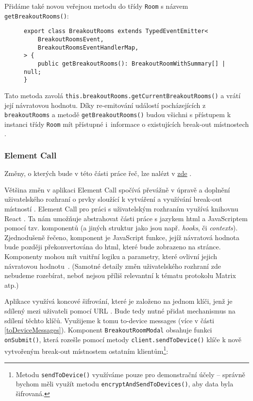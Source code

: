 Přidáme také
novou veřejnou metodu do třídy \texttt{Room} s názvem
\texttt{getBreakoutRooms()}:

\begin{figure}[H]
    \begin{verbatim}
export class BreakoutRooms extends TypedEventEmitter<
	BreakoutRoomsEvent,
	BreakoutRoomsEventHandlerMap,
> {
	public getBreakoutRooms(): BreakoutRoomWithSummary[] | null;
}
	\end{verbatim}
\end{figure}

Tato metoda zavolá
\texttt{this.breakoutRooms.getCurrentBreakoutRooms()} a vrátí
její návratovou hodnotu. Díky re-emitování událostí pocházejících z
\texttt{breakoutRooms} a metodě
\texttt{getBreakoutRooms()} budou všichni s přístupem k instanci
třídy \texttt{Room} mít přístupné i~informace o existujících
break-out místnostech \parencite{GitHub-MatrixJSSDK-BreakoutRooms}.

\subsubsection{Element Call}

Změny, o kterých bude v této části práce řeč, lze nalézt v
\href{https://github.com/vector-im/element-call/pull/1615/}{zde}
\parencite{GitHub-ElementCall-BreakoutRooms}.

Většina změn v aplikaci Element Call spočívá převážně v úpravě a doplnění
uživatelského rozhraní o prvky sloužící k vytváření a využívání break-out
místností \parencite{GitHub-ElementCall-BreakoutRooms}. Element Call pro práci s
uživatelským rozhraním využívá knihovnu React \parencite{GitHub-ElementCall}. Ta
nám umožňuje abstrahovat části práce s jazykem \gls{html} a JavaScriptem pomocí
tzv. komponentů (a jiných struktur jako jsou např. \textit{hooks}, či
\textit{contexts}). Zjednodušeně řečeno, komponent je JavaScript funkce, jejíž
návratová hodnota bude později překonvertována do \gls{html}, které bude
zobrazeno na stránce. Komponenty mohou mít vnitřní logiku a parametry, které
ovlivní jejich návratovou hodnotu~\parencite{React-Homepage}. (Samotné detaily
změn uživatelského rozhraní zde nebudeme rozebírat, neboť nejsou příliš
relevantní k tématu protokolu Matrix atp.)

\newpage

Aplikace využívá koncové šifrování, které je založeno na jednom klíči, jenž je
sdílený mezi uživateli pomocí URL
\parencite{GitHub-ElementCall-CompleteSPAE2EEWork}. Bude tedy nutné přidat
mechanismus na sdílení těchto klíčů. Využijeme k tomu to-device messages (více v
části \ref{toDeviceMessages}). Komponent
\texttt{BreakoutRoomModal} obsahuje funkci
\texttt{onSubmit()}, která rozešle pomocí metody
\texttt{client.sendToDevice()} klíče k nově vytvořeným break-out
místnostem ostatním klientům\footnote{Metodu
    \texttt{sendToDevice()} využíváme pouze pro demonstrační účely
    -- správně bychom měli využít metodu
    \texttt{encryptAndSendToDevices()}, aby data byla šifrovaná.}:

